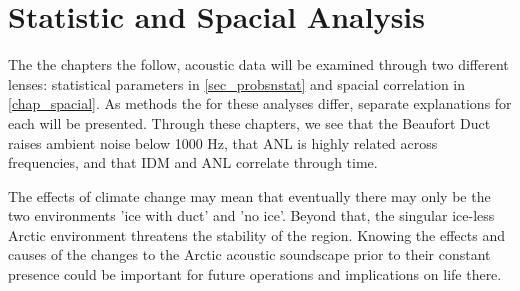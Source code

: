 \section{Statistic and Spacial Analysis}

The the chapters the follow, acoustic data will be examined through two different lenses: statistical parameters in \autoref{sec_probsnstat} and spacial correlation in \autoref{chap_spacial}. As methods the for these analyses differ, separate explanations for each will be presented. Through these chapters, we see that the Beaufort Duct raises ambient noise below 1000 Hz, that ANL is highly related across frequencies, and that IDM and ANL correlate through time.

The effects of climate change may mean that eventually there may only be the two environments 'ice with duct' and 'no ice'. Beyond that, the singular ice-less Arctic environment threatens the stability of the region. Knowing the effects and causes of the changes to the Arctic acoustic soundscape prior to their constant presence could be important for future operations and implications on life there. 

